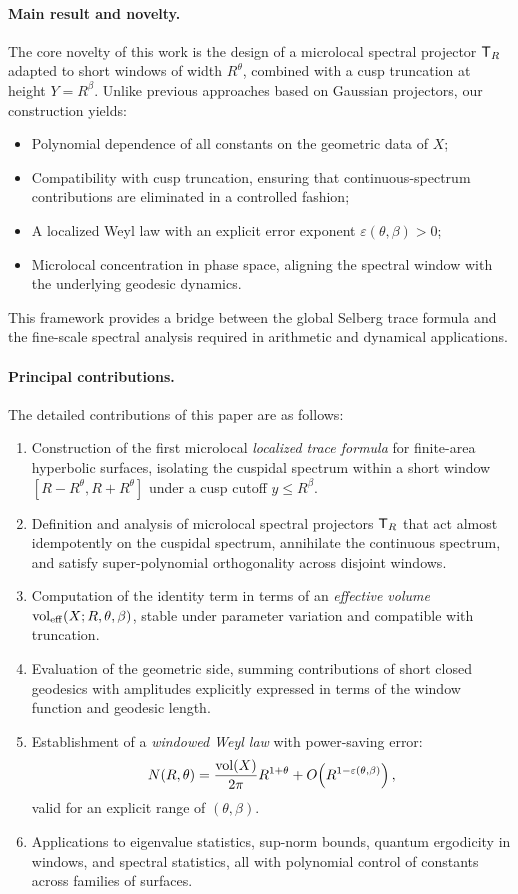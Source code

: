 \paragraph{Main result and novelty.}
The core novelty of this work is the design of a microlocal spectral projector $\mathsf{T}_R$ adapted to short windows of width $R^\theta$, combined with a cusp truncation at height $Y=R^\beta$. Unlike previous approaches based on Gaussian projectors, our construction yields:
\begin{itemize}
  \item Polynomial dependence of all constants on the geometric data of $X$;
  \item Compatibility with cusp truncation, ensuring that continuous-spectrum contributions are eliminated in a controlled fashion;
  \item A localized Weyl law with an explicit error exponent $\varepsilon(\theta,\beta) > 0$;
  \item Microlocal concentration in phase space, aligning the spectral window with the underlying geodesic dynamics.
\end{itemize}
This framework provides a bridge between the global Selberg trace formula and the fine-scale spectral analysis required in arithmetic and dynamical applications.

\paragraph{Principal contributions.}
The detailed contributions of this paper are as follows:
\begin{enumerate}
  \item Construction of the first microlocal \emph{localized trace formula} for finite-area hyperbolic surfaces, isolating the cuspidal spectrum within a short window $[R-R^\theta, R+R^\theta]$ under a cusp cutoff $y \le R^\beta$.
  \item Definition and analysis of microlocal spectral projectors $\mathsf{T}_R$ that act almost idempotently on the cuspidal spectrum, annihilate the continuous spectrum, and satisfy super-polynomial orthogonality across disjoint windows.
  \item Computation of the identity term in terms of an \emph{effective volume} $\operatorname{vol}_{\mathrm{eff}}(X;R,\theta,\beta)$, stable under parameter variation and compatible with truncation.
  \item Evaluation of the geometric side, summing contributions of short closed geodesics with amplitudes explicitly expressed in terms of the window function and geodesic length.
  \item Establishment of a \emph{windowed Weyl law} with power-saving error:
  \[
     N(R,\theta) = \frac{\operatorname{vol}(X)}{2\pi} R^{1+\theta} + O\!\left(R^{1-\varepsilon(\theta,\beta)}\right),
  \]
  valid for an explicit range of $(\theta,\beta)$.
  \item Applications to eigenvalue statistics, sup-norm bounds, quantum ergodicity in windows, and spectral statistics, all with polynomial control of constants across families of surfaces.
\end{enumerate}

